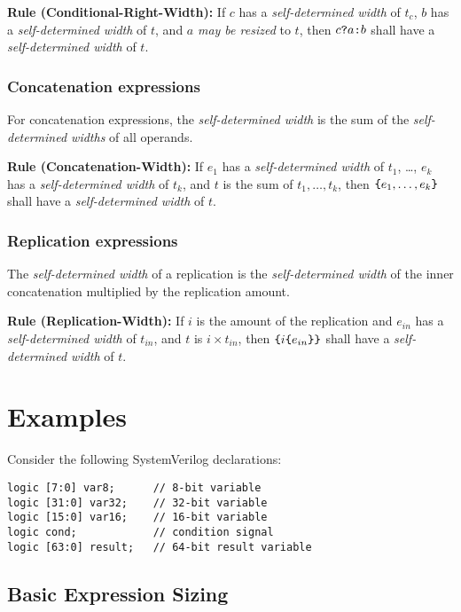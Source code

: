 \documentclass{article}
\newcommand{\sds}{\emph{self-determined width}}
\newcommand{\mbr}{\emph{may be resized}}
\newenvironment{typingrule}[1]%
{\par\noindent\textbf{Rule (#1):} }%
{\par}
\begin{document}
\begin{typingrule}{Conditional-Right-Width}
  If $c$ has a \sds{} of $t_{c}$, $b$ has a
  \sds{} of $t$, and $a$ \mbr{} to $t$,
  then $c \verb|?| a \verb|:| b$ shall have a \sds{} of
  $t$.
\end{typingrule}

\subsubsection{Concatenation expressions}%

For concatenation expressions, the \sds{} is the sum of the
\emph{self-determined widths} of all operands.

\begin{typingrule}{Concatenation-Width}
  If $e_{1}$ has a \sds{} of $t_{1}$, \ldots, $e_{k}$ has a
  \sds{} of $t_{k}$, and $t$ is the sum of
  $t_{1}, \dots, t_{k}$, then $\verb|{|e_{1}, \dots, e_{k}\verb|}|$ shall have
  a \sds{} of $t$.
\end{typingrule}

\subsubsection{Replication expressions}%

The \sds{} of a replication is the
\sds{} of the inner concatenation multiplied by the
replication amount.

\begin{typingrule}{Replication-Width}
  If $i$ is the amount of the replication and $e_{in}$ has a
  \sds{} of $t_{in}$, and $t$ is $i \times t_{in}$, then
  $\verb|{| i \verb|{| e_{in}\verb|}}|$ shall have a
  \sds{} of $t$.
\end{typingrule}

\section{Examples}

Consider the following SystemVerilog declarations:

\begin{verbatim}
logic [7:0] var8;      // 8-bit variable
logic [31:0] var32;    // 32-bit variable
logic [15:0] var16;    // 16-bit variable
logic cond;            // condition signal
logic [63:0] result;   // 64-bit result variable
\end{verbatim}

\subsection{Basic Expression Sizing}
\end{document}
